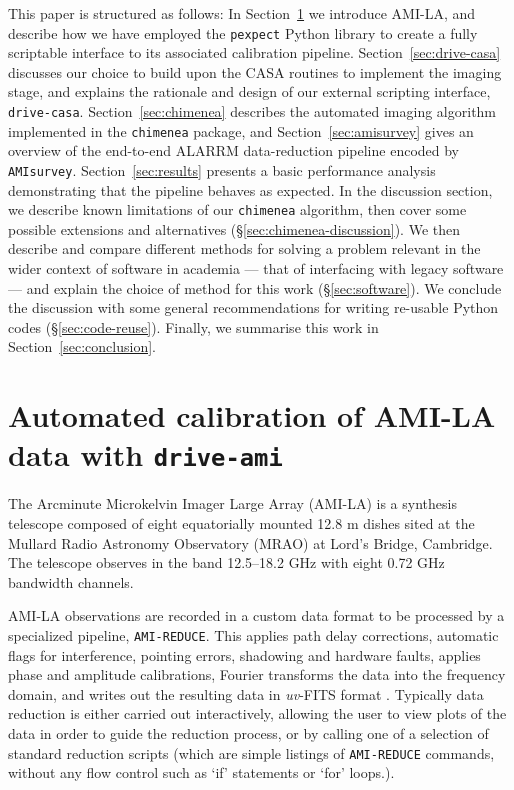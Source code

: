 \documentclass[5p,authoryear]{elsarticle}
\begin{document}
This paper is structured as follows: 
% 
In Section~\ref{sec:drive-ami} we introduce AMI-LA, and describe how we have employed the \texttt{pexpect} Python library to create a fully scriptable interface to its associated calibration pipeline.
% 
Section~\ref{sec:drive-casa} discusses our choice to build upon the CASA routines to implement the imaging stage, and explains the rationale and design of our external
scripting interface, \texttt{drive-casa}.
Section~\ref{sec:chimenea} describes the automated imaging algorithm implemented in the \texttt{chimenea} package, and Section~\ref{sec:amisurvey} gives an overview of the end-to-end ALARRM data-reduction pipeline encoded by \texttt{AMIsurvey}.
Section~\ref{sec:results} presents a basic performance analysis demonstrating that the pipeline behaves as expected.
In the discussion section, we describe known limitations of our \texttt{chimenea} algorithm, then cover some possible extensions and alternatives (\S\ref{sec:chimenea-discussion}). 
We then describe and compare different methods for solving a problem relevant in the wider context of software in academia --- that of interfacing with legacy software --- and explain the choice of method for this work (\S\ref{sec:software}). 
We conclude the discussion with some general recommendations for writing re-usable Python codes (\S\ref{sec:code-reuse}). 
Finally, we summarise this work in Section~\ref{sec:conclusion}.


\section{Automated calibration of AMI-LA data with \texttt{drive-ami}}
\label{sec:drive-ami}
The Arcminute Microkelvin Imager Large Array (AMI-LA) is a synthesis telescope composed
of eight equatorially mounted 12.8 m dishes sited at the Mullard
Radio Astronomy Observatory (MRAO) at Lord’s Bridge, Cambridge. The
telescope observes in the band 12.5–18.2 GHz with eight 0.72 GHz
bandwidth channels. 

AMI-LA observations are recorded in a custom data format to be processed by a specialized pipeline, \texttt{AMI-REDUCE}. 
This applies path delay corrections, automatic flags for interference, pointing errors, shadowing and hardware faults, applies phase and amplitude calibrations, Fourier transforms the data into the frequency domain, and writes out the resulting data in \textit{uv}-FITS format \citep{Davies2009}. 
Typically data reduction is either carried out interactively, allowing the user to view plots of the data in order to guide the reduction process, or by calling one of a selection of standard reduction scripts (which are simple listings of \texttt{AMI-REDUCE} commands, without any flow control such as `if' statements or `for' loops.). 
\end{document}
